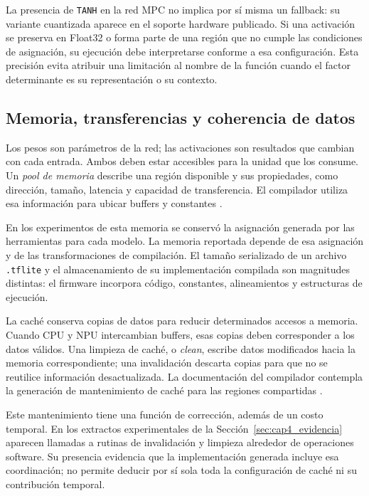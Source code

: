 La presencia de \texttt{TANH} en la red MPC no implica por sí misma un fallback: su variante cuantizada aparece en el soporte hardware publicado. Si una activación se preserva en Float32 o forma parte de una región que no cumple las condiciones de asignación, su ejecución debe interpretarse conforme a esa configuración. Esta precisión evita atribuir una limitación al nombre de la función cuando el factor determinante es su representación o su contexto.

\subsection{Memoria, transferencias y coherencia de datos}\label{sec:cap4_memoria}
Los pesos son parámetros de la red; las activaciones son resultados que cambian con cada entrada. Ambos deben estar accesibles para la unidad que los consume. Un \emph{pool de memoria} describe una región disponible y sus propiedades, como dirección, tamaño, latencia y capacidad de transferencia. El compilador utiliza esa información para ubicar buffers y constantes \cite{cap4_stcompiler}.

En los experimentos de esta memoria se conservó la asignación generada por las herramientas para cada modelo. La memoria reportada depende de esa asignación y de las transformaciones de compilación. El tamaño serializado de un archivo \texttt{.tflite} y el almacenamiento de su implementación compilada son magnitudes distintas: el firmware incorpora código, constantes, alineamientos y estructuras de ejecución.

La caché conserva copias de datos para reducir determinados accesos a memoria. Cuando CPU y NPU intercambian buffers, esas copias deben corresponder a los datos válidos. Una limpieza de caché, o \textit{clean}, escribe datos modificados hacia la memoria correspondiente; una invalidación descarta copias para que no se reutilice información desactualizada. La documentación del compilador contempla la generación de mantenimiento de caché para las regiones compartidas \cite{cap4_stcompiler}.

Este mantenimiento tiene una función de corrección, además de un costo temporal. En los extractos experimentales de la Sección~\ref{sec:cap4_evidencia} aparecen llamadas a rutinas de invalidación y limpieza alrededor de operaciones software. Su presencia evidencia que la implementación generada incluye esa coordinación; no permite deducir por sí sola toda la configuración de caché ni su contribución temporal.

